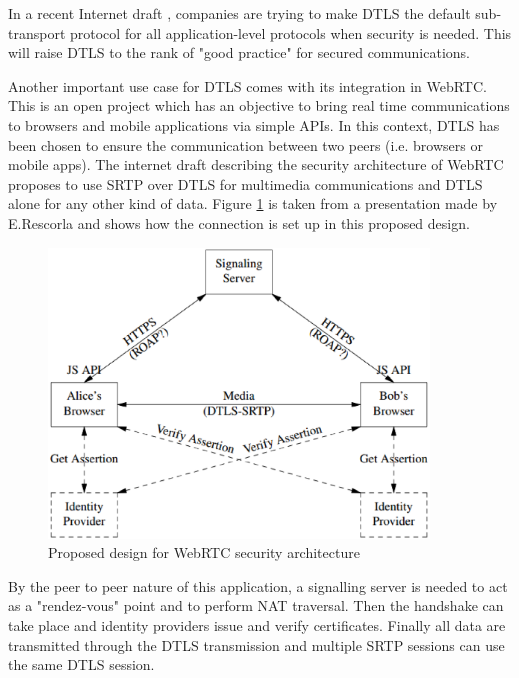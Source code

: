 In a recent Internet draft \cite{dtls-as-subtransport}, companies are trying to make DTLS the default sub-transport protocol for all application-level protocols when security is needed. This will raise DTLS to the rank of "good practice" for secured communications.

Another important use case for DTLS comes with its integration in WebRTC\cite{bergkvist2012webrtc}. This is an open project which has an objective to bring real time communications to browsers and mobile applications via simple APIs. In this context, DTLS has been chosen to ensure the communication between two peers (i.e. browsers or mobile apps). The internet draft describing the security architecture of WebRTC \cite{ietf-rtcweb-security-arch} proposes to use SRTP over DTLS for multimedia communications and DTLS alone for any other kind of data. Figure \ref{fig:webrtc} is taken from a presentation \cite{rescorla2011proposed} made by E.Rescorla and shows how the connection is set up in this proposed design.  

\begin{figure}[!ht]
\centering
\includegraphics[width=0.9\textwidth]{images/webrtc.eps}
\caption{Proposed design for WebRTC security architecture}
\label{fig:webrtc}
\end{figure}

By the peer to peer nature of this application, a signalling server is needed to act as a "rendez-vous" point and to perform NAT traversal. Then the handshake can take place and identity providers issue and verify certificates. Finally all data are transmitted through the DTLS transmission and multiple SRTP sessions can use the same DTLS session. 

